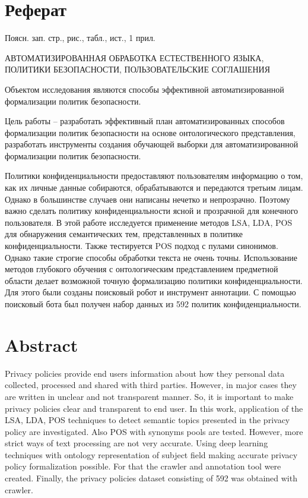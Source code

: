 \documentclass[../main]{subfiles}
\begin{document}
\newpage
{}
\section*{Реферат}
Поясн. зап.  стр.,   рис.,  табл.,  ист., 1 прил.

{   
    \jj\parindent=12.5mm
    \par
    \MakeUppercase{автоматизированная обработка естественного языка, политики безопасности, пользовательские соглашения}
    \par
}

Объектом  исследования являются способы эффективной автоматизированной формализации политик безопасности.

Цель работы -- разработать эффективный план автоматизированных способов формализации политик безопасности на основе онтологического представления, разработать инструменты создания обучающей выборки для автоматизированной формализации политик безопасности.

Политики конфиденциальности предоставляют пользователям информацию о том, как их личные данные собираются, обрабатываются и передаются третьим лицам. Однако в большинстве случаев они написаны нечетко и непрозрачно. Поэтому важно сделать политику конфиденциальности ясной и прозрачной для конечного пользователя. В этой работе исследуется применение методов LSA, LDA, POS для обнаружения семантических тем, представленных в политике конфиденциальности. Также тестируется POS подход с пулами синонимов. Однако такие строгие способы обработки текста не очень точны. Использование методов глубокого обучения с онтологическим представлением предметной области делает возможной точную формализацию политики конфиденциальности. Для этого были созданы поисковый робот и инструмент аннотации. С помощью поисковый бота был получен набор данных из 592 политик конфиденциальности. 

\newpage
\section*{Abstract}
Privacy policies provide end users information about how they personal data collected, processed and shared with third parties. However, in major cases they are written in unclear and not transparent manner. So, it is important to make privacy  policies clear and transparent to end user. In this work, application of the LSA, LDA, POS techniques to detect semantic topics presented in the privacy policy are investigated. Also POS with synonyms pools are tested. However, more strict ways of text processing are not very accurate. Using deep learning techniques with ontology representation of subject field making accurate privacy policy formalization possible. For that the crawler and annotation tool were created. Finally, the privacy policies dataset consisting of 592 was obtained with crawler.
\end{document}
